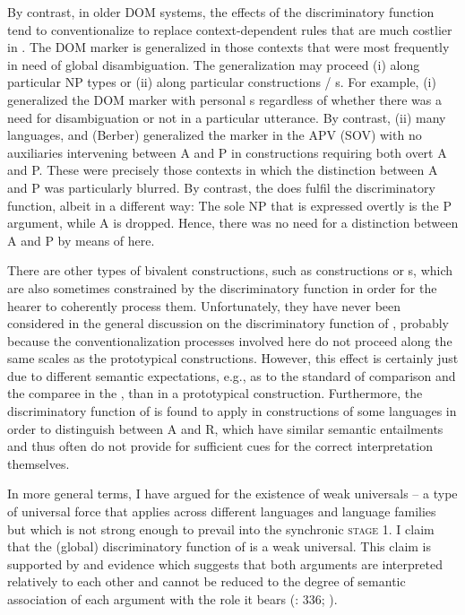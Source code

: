 \documentclass[output=paper]{langsci/langscibook}
\begin{document}
By contrast, in older DOM systems, the effects of the discriminatory function tend to conventionalize to replace context-dependent rules that are much costlier in . The DOM marker is generalized in those contexts that were most frequently in need of global disambiguation. The generalization may proceed (i) along particular NP types or (ii) along particular constructions / s. For example, (i)  generalized the DOM marker with personal s regardless of whether there was a need for disambiguation or not in a particular utterance. By contrast, (ii) many  languages,  and  (Berber) generalized the marker in the APV (SOV)  with no auxiliaries intervening between A and P in constructions requiring both overt A and P. These were precisely those contexts in which the distinction between A and P was particularly blurred. By contrast, the  does fulfil the discriminatory function, albeit in a different way: The sole NP that is expressed overtly is the P argument, while A is dropped. Hence, there was no need for a distinction between A and P by means of  here.

There are other types of bivalent constructions, such as  constructions or s, which are also sometimes constrained by the discriminatory function in order for the hearer to coherently process them. Unfortunately, they have never been considered in the general discussion on the discriminatory function of , probably because the conventionalization processes involved here do not proceed along the same scales as the prototypical  constructions. However, this effect is certainly just due to different semantic expectations, e.g., as to the standard of comparison and the comparee in the , than in a prototypical  construction. Furthermore, the discriminatory function of  is found to apply in  constructions of some languages in order to distinguish between A and R, which have similar semantic entailments and thus often do not provide for sufficient cues for the correct interpretation themselves. 

In more general terms, I have argued for the existence of weak universals – a type of universal force that applies across different languages and language families but which is not strong enough to prevail into the synchronic \textsc{stage} 1. I claim that the (global) discriminatory function of  is a weak universal. This claim is supported by  and  evidence which suggests that both arguments are interpreted relatively to each other and cannot be reduced to the degree of semantic association of each argument with the role it bears (\citealt{Bornkessel-SchlesewskySchlesewsky2015}: 336; \citealt{AhnCho2007,FedzechkinaEtAl2012,KurumadaJaeger2015}).
\end{document}
